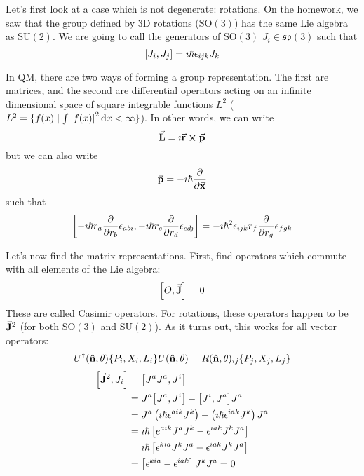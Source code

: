 \documentclass[a4paper,twoside,master.tex]{subfiles}
\begin{document}
Let's first look at a case which is not degenerate: rotations. On the homework, we saw that the group defined by 3D rotations ($ \text{SO}(3) $) has the same Lie algebra as $ \text{SU}(2) $. We are going to call the generators of $ \text{SO}(3) $ $ J_i \in \mathfrak{so}(3) $ such that
\begin{equation}
    \comm{J_i}{J_j} = \imath \hbar \epsilon_{ijk} J_k
\end{equation}

In QM, there are two ways of forming a group representation. The first are matrices, and the second are differential operators acting on an infinite dimensional space of square integrable functions $ L^2 $ ($L^2 =\{f(x)\mid \int \abs{f(x)}^2 \dd{x} < \infty \}$). In other words, we can write
\begin{equation}
    \va{ L} = \imath\va{ r} \cross\va{ p}
\end{equation}
but we can also write
\begin{equation}
    \va{ p} = - \imath \hbar \pdv{\va{x}}
\end{equation}
such that
\begin{equation}
    \comm{- \imath \hbar r_a \pdv{r_b} \epsilon_{abi}}{- \imath \hbar r_c \pdv{r_d} \epsilon_{cdj}} = -\imath \hbar^2 \epsilon_{ijk} r_f \pdv{r_g} \epsilon_{fgk}
\end{equation}

Let's now find the matrix representations. First, find operators which commute with all elements of the Lie algebra:
\begin{equation}
    \comm{O}{\va{J}} = 0
\end{equation}
These are called Casimir operators. For rotations, these operators happen to be $\va{ J}^2 $ (for both $ \text{SO}(3) $ and $ \text{SU}(2) $). As it turns out, this works for all vector operators:
\begin{equation}
    U^\dagger(\vu{n}, \theta) \{P_i, X_i, L_i\} U(\vu{n}, \theta)  = R(\vu{n}, \theta)_{ij} \{P_j, X_j, L_j\}
\end{equation}
\begin{align}
    \comm{\va{J}^2}{J_i} &= \comm{J^a J^a}{J^i} \\
    &= J^a \comm{J^a}{J^i} - \comm{J^i}{J^a} J^a \\
    &= J^a \left( i \hbar \epsilon^{aik} J^k \right) - \left( \imath \hbar \epsilon^{iak} J^k \right) J^a \\
    &= \imath \hbar \left[ e^{aik} J^a J^k - \epsilon^{iak} J^k J^a \right] \\
    &= \imath \hbar \left[ \epsilon^{kia} J^k J^a - \epsilon^{iak} J^k J^a \right] \\
    &= \left[ \epsilon^{kia} - \epsilon^{iak} \right] J^k J^a = 0
\end{align}
\end{document}
